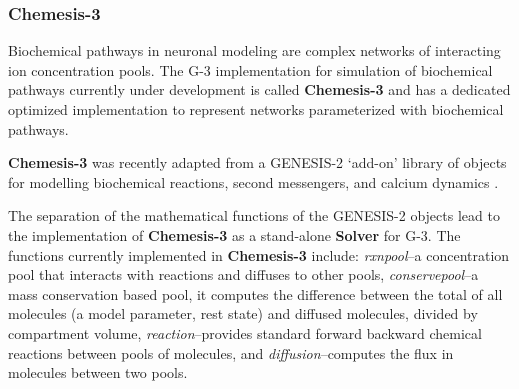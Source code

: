 \documentclass[11pt,3p,twocolumn]{JMN}
\begin{document}


\subsubsection{Chemesis-3}

Biochemical pathways in neuronal modeling are complex networks of interacting ion concentration pools.  The G-3 implementation for simulation of biochemical pathways currently under development is called {\bf Chemesis-3} and has a dedicated optimized implementation to represent networks parameterized with biochemical pathways.

{\bf Chemesis-3} was recently adapted from a GENESIS-2 `add-on' library of objects for modelling biochemical reactions, second messengers, and calcium dynamics \cite{blackwell00:_eviden_distin_light_induc_calcium}.

The separation of the mathematical functions of the GENESIS-2 objects lead to the implementation of {\bf Chemesis-3} as a stand-alone {\bf
  Solver} for G-3.  The functions currently implemented in {\bf Chemesis-3} include: {\it rxnpool}--a concentration pool that interacts with reactions and diffuses to other pools, {\it conservepool}--a mass conservation based pool, it computes the difference between the total of all molecules (a model parameter, rest state) and diffused molecules, divided by compartment volume, {\it reaction}--provides standard forward backward chemical reactions between pools of molecules, and {\it diffusion}--computes the flux in molecules between two pools.
\end{document}
